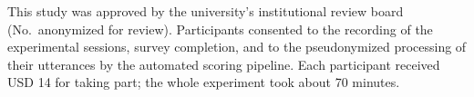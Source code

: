 This study was approved by the university's institutional review board (No.\ anonymized for review). 
Participants consented to the recording of the experimental sessions, survey completion, and to the pseudonymized processing of their utterances by the automated scoring pipeline. Each participant received USD 14 for taking part; the whole experiment took about 70 minutes.









